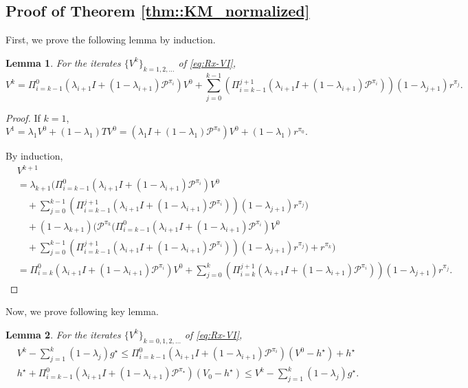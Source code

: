 \documentclass{article} %
\newcommand{\cP}{\mathcal{P}}
\newcommand*{\para}[1]{\left({#1}\right)}
\newtheorem{lemma}{Lemma}
\begin{document}
\subsection{Proof of Theorem \ref{thm::KM_normalized}}
First, we prove the following lemma by induction.
\begin{lemma}\label{lem::KM_expansion}
For the iterates $\{V^k\}_{k=1,2,\dots}$ of \ref{eq:Rx-VI}, 
 \[V^k= \Pi^{0}_{i=k-1}(\lambda_{i+1}I+(1-\lambda_{i+1}) \cP^{\pi_i}) V^0+ \sum^{k-1}_{j=0}\para{\Pi_{i=k-1}^{j+1}(\lambda_{i+1}I+(1-\lambda_{i+1}) \cP^{\pi_i})}(1-\lambda_{j+1}) r^{\pi_j}.\]
\end{lemma}
\begin{proof}
       If $k=1$, $V^1= \lambda_1 V^0+(1-\lambda_1)TV^0=(\lambda_1 I +(1-\lambda_1)\cP^{\pi_0})V^0+(1-\lambda_1)r^{\pi_0}$. 

       By induction,
       \begin{align*}
           &V^{k+1} \\&= \lambda_{k+1}\Bigg(\Pi^{0}_{i=k-1}(\lambda_{i+1}I+(1-\lambda_{i+1}) \cP^{\pi_i}) V^0 
           \\& \quad+ \sum^{k-1}_{j=0}\para{\Pi_{i=k-1}^{j+1}(\lambda_{i+1}I+(1-\lambda_{i+1}) \cP^{\pi_i})}(1-\lambda_{j+1}) r^{\pi_j}\Bigg)
           \\ & \quad+(1-\lambda_{k+1})\Bigg(\cP^{\pi_k}\Bigg(\Pi^{0}_{i=k-1}(\lambda_{i+1}I+(1-\lambda_{i+1}) \cP^{\pi_i}) V^0 
           \\& \quad + \sum^{k-1}_{j=0} \para{\Pi_{i=k-1}^{j+1}(\lambda_{i+1}I+(1-\lambda_{i+1}) \cP^{\pi_i})}(1-\lambda_{j+1}) r^{\pi_j}\Bigg)
           +r^{\pi_k} \Bigg)
           \\& = \Pi^{0}_{i=k}(\lambda_{i+1}I+(1-\lambda_{i+1}) \cP^{\pi_i}) V^0+ \sum^{k}_{j=0}\para{\Pi_{i=k}^{j+1}(\lambda_{i+1}I+(1-\lambda_{i+1}) \cP^{\pi_i})}(1-\lambda_{j+1}) r^{\pi_j}.
       \end{align*}
\end{proof}
 Now, we prove following key lemma. 
\begin{lemma}\label{lem::KM_normalized_iterate}
For the iterates $\{V^k\}_{k=0, 1,2,\dots}$ of \ref{eq:Rx-VI},
\begin{align*} 
     & V^k- \sum^{k}_{j=1} (1-\lambda_{j})g^{\star} \le \Pi^{0}_{i=k-1}(\lambda_{i+1}I+(1-\lambda_{i+1}) \cP^{\pi_i}) (V^0-h^{\star})+h^{\star} \\ &   h^{\star}+\Pi^{0}_{i=k-1}(\lambda_{i+1}I+(1-\lambda_{i+1}) \cP^{\pi_{\star}})(V_0-h^{\star})  \le V^k- \sum^{k}_{j=1} (1-\lambda_{j})g^{\star}.
\end{align*}
\end{lemma}
\end{document}
